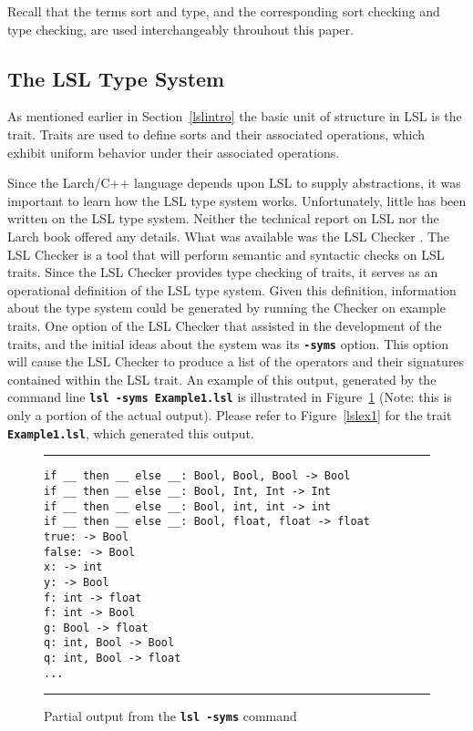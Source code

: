 \documentclass[12pt]{article} %
\newcommand{\reserved}[1]{\textbf{\texttt{#1}}} %
\newcommand{\UNSPACEFORBOX}{\vspace{-2ex}}
\newcommand{\HLINE}{\UNSPACEFORBOX%
\begin{flushleft}\rule{\textwidth}{0.01in}\end{flushleft}%
\UNSPACEFORBOX}
\newenvironment{BFIGURE}{

\begin{figure}
\small
\HLINE
}{
\HLINE
\normalsize
\end{figure}
}
\begin{document}
Recall that the terms sort and type, and the corresponding
sort checking and type checking, are used interchangeably throuhout
this paper.

\subsection{The LSL Type System}
\label{lslts}
As mentioned earlier in Section~\ref{lslintro} the basic unit of
structure in LSL is the trait. Traits are used to define sorts and
their associated operations, which exhibit uniform behavior under
their associated operations.

Since the Larch/C++ language depends upon LSL to supply
abstractions, it was important to learn how the LSL type system
works. Unfortunately, little has been written on the LSL type
system. Neither the technical report on LSL
\cite{Guttag-Horning-Modet90} nor the Larch book \cite{Guttag-Horning93}
offered any details. What was available was the LSL Checker
\cite{LSLChecker}. The LSL Checker is a tool that will perform semantic and
syntactic checks on LSL traits. Since the LSL Checker provides type
checking of traits, it serves as an operational definition of the
LSL type system. Given this definition, information about the type
system could be generated by running the Checker on example
traits. One option of the LSL Checker that assisted in the development
of the traits, and the initial ideas about the system was its \reserved{-syms}
option. This option will cause the LSL Checker to produce a list of
the operators and their signatures contained within the LSL trait. An
example of this output, generated by the command line \reserved{lsl
-syms Example1.lsl} is illustrated in Figure~\ref{symsoutput} (Note:
this is only a portion of the actual output). Please refer to
Figure~\ref{lslex1} for the trait \reserved{Example1.lsl}, which
generated this output. 
\begin{BFIGURE}
\begin{verbatim}
if __ then __ else __: Bool, Bool, Bool -> Bool
if __ then __ else __: Bool, Int, Int -> Int
if __ then __ else __: Bool, int, int -> int
if __ then __ else __: Bool, float, float -> float
true: -> Bool
false: -> Bool
x: -> int
y: -> Bool
f: int -> float
f: int -> Bool
g: Bool -> float
q: int, Bool -> Bool
q: int, Bool -> float
...
\end{verbatim}
\caption{Partial output from the \reserved{lsl -syms} command}
\label{symsoutput}
\end{BFIGURE}
\end{document}
